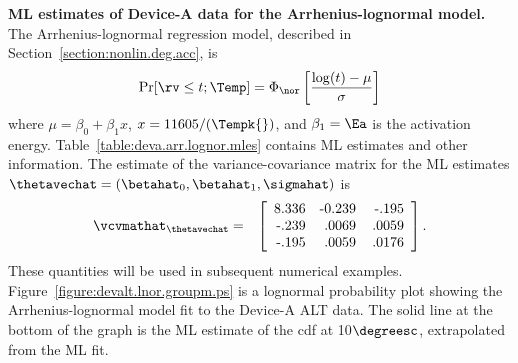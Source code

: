 \begin{example}
{\bf ML estimates of Device-A data for the Arrhenius-lognormal model.}
\label{example:devicea.arr.log.model}
The Arrhenius-lognormal regression model, described in
Section~\ref{section:nonlin.deg.acc}, is
\begin{displaymath}
\Pr[\rv \leq t;\Temp] = \Phi_{\nor} \left[\frac{\log(t)-\mu}{\sigma} \right]
\end{displaymath}
where $\mu = \beta_{0}+ \beta_{1} x$, $x=11605/(\Tempk{})$, and
$\beta_{1}=\Ea$ is the activation energy.
Table~\ref{table:deva.arr.lognor.mles} contains ML estimates and
other information. The estimate of the variance-covariance matrix
for the ML estimates
$\thetavechat=(\betahat_{0},\betahat_{1},\sigmahat)$ is
\begin{eqnarray}
\label{equation:devicea.local.est.vcv}
\vcvmathat_{\thetavechat} &=&
\left[ 
\begin{array}{rrr}
 8.336  & $-0.239$ & $ -.195$\\
$-.239$ & $.0069$  & $.0059$\\
$-.195$ & $.0059$  & $.0176$\\
\end{array}
\right].
\end{eqnarray}
These quantities will be used in subsequent numerical examples.
Figure~\ref{figure:devalt.lnor.groupm.ps} is a lognormal probability
plot showing the
Arrhenius-lognormal model fit to the Device-A ALT data. The solid line at
the bottom of the graph is the ML estimate of the cdf at
10$\degreesc$, extrapolated from the ML fit.  


\end{example}
